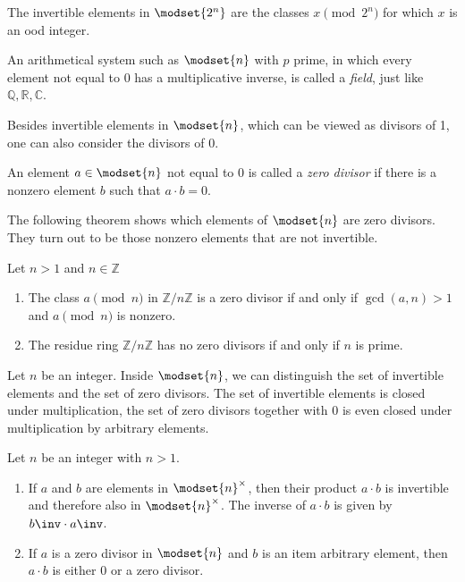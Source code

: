 \begin{example}
    The invertible elements in $ \modset{2^n} $ are the classes $ x \pmod{2^n} $
    for which $x$ is an ood integer.
\end{example}

An arithmetical system such as $ \modset{n} $ with $p$ prime, in which every
element not equal to 0 has a multiplicative inverse, is called a \emph{field},
just like $ \mathbb{Q}, \mathbb{R}, \mathbb{C} $.

Besides invertible elements in $ \modset{n} $, which can be viewed as divisors
of 1, one can also consider the divisors of 0.

\begin{definition}
    An element $ a \in \modset{n} $ not equal to 0 is called a \emph{zero
    divisor} if there is a nonzero element $b$ such that $a \cdot b = 0$.
\end{definition}

The following theorem shows which elements of $ \modset{n} $ are zero divisors.
They turn out to be those nonzero elements that are not invertible.

\begin{theorem}
    Let $ n>1 $ and $ n \in \mathbb{Z} $
    \begin{enumerate}
        \item The class $ a \pmod{n} $ in $ \mathbb{Z}/n\mathbb{Z} $ is a zero divisor if and only if $ \gcd(a,n) > 1 $ and $ a \pmod{n} $ is nonzero.
        \item The residue ring $ \mathbb{Z}/n\mathbb{Z} $ has no zero divisors if and only if $n$ is prime.
    \end{enumerate}
\end{theorem}

Let $n$ be an integer. Inside $ \modset{n} $, we can distinguish the set of
invertible elements and the set of zero divisors. The set of invertible
elements is closed under multiplication, the set of zero divisors together
with 0 is even closed under multiplication by arbitrary elements.

\begin{lemma}
    Let $n$ be an integer with $n > 1$.
    \begin{enumerate}
        \item If $a$ and $b$ are elements in $\modset{n}^\times$, then their
        product $a \cdot b$ is invertible and therefore also in
        $ \modset{n}^\times $. The inverse of $a\cdot b$ is given by
        $ b\inv\cdot a\inv$.
        \item If $a$ is a zero divisor in $ \modset{n} $ and $b$ is an item
        arbitrary element, then $a \cdot b$ is either 0 or a zero divisor.
    \end{enumerate}
\end{lemma}

